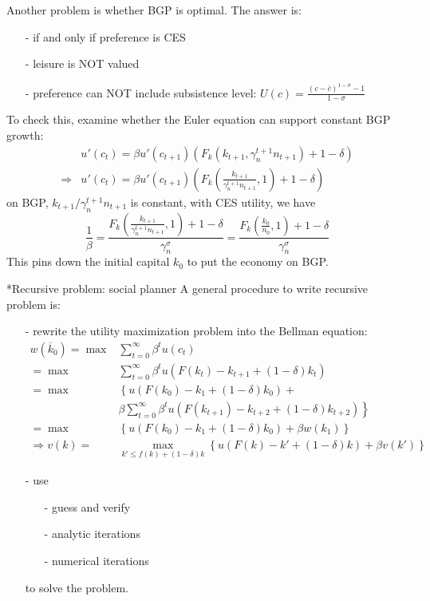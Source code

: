 \documentclass[10pt,landscape,a4paper]{article}
\makeatletter
\let\bar\overline
\renewcommand{\subsection}{\@startsection{subsection}{1}{0mm}{.2ex}{.2ex}{\small\bfseries}}
\makeatother
\begin{document}
\begin{multicols*}{3}
Another problem is whether BGP is optimal. The answer is:
\begin{itemize}
    \item[-] if and only if preference is CES
    \item[-] leisure is NOT valued
    \item[-] preference can NOT include subsistence level: $U(c)=\frac{(c-\bar{c})^{1-\sigma}-1}{1-\sigma}$
\end{itemize}

To check this, examine whether the Euler equation can support constant BGP growth:
\begin{align*}
    &u'(c_t)=\beta u'(c_{t+1})\left( F_k(k_{t+1},\gamma_n^{t+1}n_{t+1})+1-\delta \right)\\
    \Rightarrow & u'(c_t)=\beta u'(c_{t+1})\left( F_k\left(\frac{k_{t+1}}{\gamma_n^{t+1}n_{t+1}},1\right)+1-\delta \right)
\end{align*}
on BGP, $k_{t+1}/\gamma_n^{t+1}n_{t+1}$ is constant, with CES utility, we have
$$
\frac{1}{\beta}= \frac{ F_k\left(\frac{k_{t+1}}{\gamma_n^{t+1}n_{t+1}},1\right)+1-\delta}{\gamma_n^{\sigma}}= \frac{ F_k\left(\frac{k_0}{n_0},1\right)+1-\delta}{\gamma_n^{\sigma}}
$$
This pins down the initial capital $k_0$ to put the economy on BGP.

\subsection*{Recursive problem: social planner}
A general procedure to write recursive problem is:
\begin{itemize}
    \item[-] rewrite the utility maximization problem into the Bellman equation:
    \begin{align*}
        w\left(\bar{k}_0\right) = \max& \sum^{\infty}_{t=0}\beta^t u(c_t) \\
    = \max & \sum^{\infty}_{t=0}\beta^t u(F(k_t)-k_{t+1}+(1-\delta)k_t)\\
        = \max& \left\{ u(F(k_0)-k_1+(1-\delta)k_0) +\right.\\
        & \left. \beta\sum^{\infty}_{t=0}\beta^t u(F(k_{t+1})-k_{t+2}+(1-\delta)k_{t+2}) \right\}\\
        = \max& \left\{ u(F(k_0)-k_1+(1-\delta)k_0) + \beta w(k_1) \right\}\\
        \Rightarrow v(k)=& \max_{k'\leq f(k)+(1-\delta)k}\left\{ u(F(k)-k'+(1-\delta)k)+\beta v(k') \right\}
    \end{align*}
    \item[-] use
    \begin{itemize}
        \item[-] guess and verify
        \item[-] analytic iterations
        \item[-] numerical iterations
    \end{itemize}
    to solve the problem.
\end{itemize}


\end{multicols*}
\end{document}
